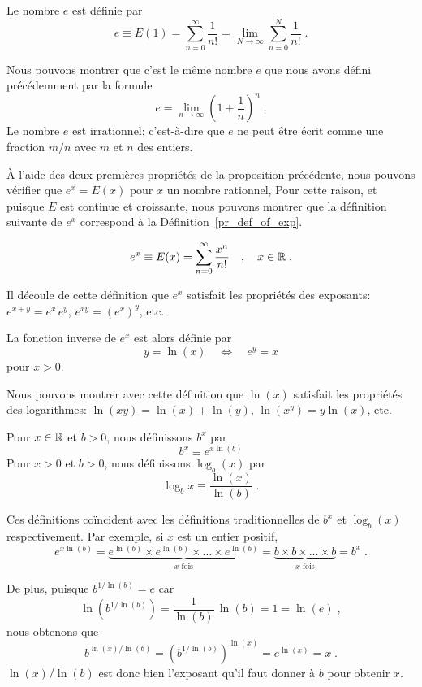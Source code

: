 {\begin{defn}
Le nombre $e$ est définie par
\[
e \equiv E(1) = \sum_{n=0}^\infty \frac{1}{n!}
= \lim_{N\rightarrow \infty} \sum_{n=0}^N \frac{1}{n!} \; .
\]
\end{defn}

Nous pouvons montrer que c'est le même nombre $e$ que nous avons
défini précédemment par la formule
\[
e = \lim_{n\rightarrow \infty} \left(1+\frac{1}{n}\right)^n \; .
\]
Le nombre $e$ est irrationnel; c'est-à-dire que $e$ ne peut être écrit comme
une fraction $m/n$ avec $m$ et $n$ des entiers.

À l'aide des deux premières propriétés de la proposition précédente,
nous pouvons vérifier que $e^x = E(x)$ pour $x$ un nombre rationnel,
Pour cette raison,
et puisque $E$ est continue et croissante, nous pouvons montrer que la
définition suivante de $e^x$ correspond à la Définition~\ref{pr_def_of_exp}.

\begin{defn}
\[
e^x \equiv E(x) = \sum_{n=0}^\infty \frac{x^n}{n!} \quad , \quad x \in \mathbb{R} \; .
\]
\end{defn}

Il découle de cette définition que $e^x$ satisfait les propriétés des
exposants: $e^{x+y} = e^x\, e^y$, $e^{xy} = (e^x)^y$, etc.

\begin{defn}
La fonction inverse de $e^x$ est alors définie par
\[
y = \ln (x) \quad \Leftrightarrow \quad e^y=x
\]
pour $x>0$.
\end{defn}

Nous pouvons montrer avec cette définition que $\ln(x)$ satisfait les
propriétés des logarithmes:
$\ln(xy) = \ln(x)+\ln(y)$, $\ln(x^y) = y\ln(x)$, etc.

\begin{defn}
Pour $x\in \mathbb{R}$ et $b>0$, nous définissons $b^x$ par
\[
b^x \equiv e^{x\ln(b)}
\]
Pour $x > 0$ et $b>0$, nous définissons $\log_b(x)$ par
\[
\log_b{x} \equiv \frac{\ln(x)}{\ln(b)} \; .
\]
\end{defn}

Ces définitions coïncident avec les définitions traditionnelles de $b^x$ et
$\log_b(x)$ respectivement.  Par exemple, si $x$ est un entier positif,
\[
e^{x\ln(b)} = \underbrace{e^{\ln(b)} \times e^{\ln(b)} \times
  \ldots \times e^{\ln(b)}}_{x \text{ fois}}
= \underbrace{b \times b \times \ldots \times b}_{x \text{ fois}}
= b^x \; .
\]

De plus, puisque $\displaystyle b^{1/\ln(b)} = e$ car
\[
\ln( b^{1/\ln(b)} ) = \frac{1}{\ln(b)} \, \ln(b) = 1 = \ln(e) \;,
\]
nous obtenons que
\[
b^{\ln(x)/\ln(b)} = \left(b^{1/\ln(b)}\right)^{\ln(x)}
= e^{\ln(x)} = x \; .
\]
$\ln(x)/\ln(b)$ est donc bien l'exposant qu'il faut donner à $b$ pour obtenir
$x$.

}
